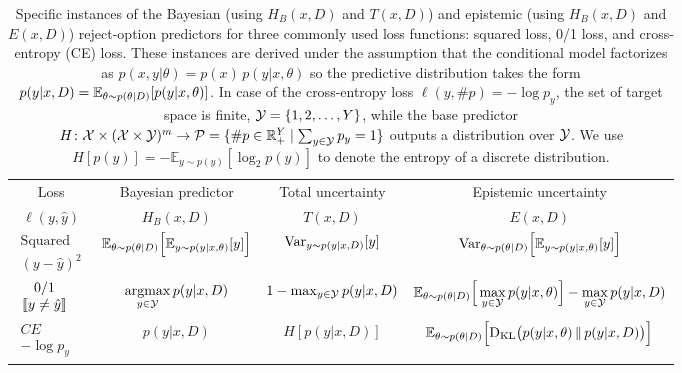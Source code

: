 \begin{table}[]
    \centering
    \begin{tabular}{l|c|c|c}
          \multicolumn{1}{c|}{Loss}& Bayesian predictor & Total uncertainty & Epistemic uncertainty\\
          \multicolumn{1}{c|}{$\ell(y,\hat{y})$} & $H_B(x,D)$        & $T(x,D)$          & $E(x,D)$ \\
       \hline%
       \hline
       $\begin{array}{c}\text{Squared} \\ (y-\hat{y})^2\end{array}$ &
       ${\mathbb{E}}_{\theta\sim p(\theta|D)}\Big[{\mathbb{E}}_{y\sim p(y|x,\theta)}[y] \Big ]$  &
       ${\rm Var}_{y\sim p(y|x,D)} [y]$&
       ${\rm Var}_{\theta\sim p(\theta|D)} \Big [ {\mathbb{E}}_{y\sim p(y|x,\theta)}[y] \Big ]$\\
       \hline
       $\begin{array}{c}\text{0/1} \\ \leftbb y\neq \hat{y}\rightbb\end{array}$ & 
       $\mathop{\rm argmax}\limits_{y\in{\cal Y}} p(y|x,D)$  &
       $1-\max_{y\in{\cal Y}} p(y|x,D)$ &
       ${\mathbb{E}}_{\theta\sim p(\theta|D)}\Big[ \max\limits_{y\in{\cal Y}} p(y|x,\theta)\Big ] - \max\limits_{y\in{\cal Y}} p(y|x,D)$ \\
       \hline
       $\begin{array}{c}CE\\  -\log p_y\end{array}$ & $p(y|x,D)$ & $H[p(y|x,D)]$ &
       ${\mathbb{E}}_{\theta\sim p(\theta|D)} \Big [{\rm D}_{\rm KL}\big (p(y|x,\theta)\, \|\, p(y|x,D)\big ) \Big ]$ \\       
    \end{tabular}
    \caption{Specific instances of the Bayesian (using $H_B(x,D)$ and $T(x,D)$) and epistemic (using $H_B(x,D)$ and $E(x,D)$) reject-option predictors for three commonly used loss functions: squared loss, 0/1 loss, and cross-entropy (CE) loss. These instances are derived under the assumption that the conditional model factorizes as $p(x,y|\theta)=p(x)\,p(y|x,\theta)$
    so the predictive distribution takes the form $p(y|x,D)={\mathbb{E}}_{\theta\sim p(\theta|D)}[p(y|x,\theta)]$.
    In case of the cross-entropy loss $\ell(y,\#p)=-\log p_y$, the set of target space is finite, ${\cal Y}=\{1,2,\ldots,Y\}$, while the base predictor $H\colon{\cal X}\times({\cal X}\times{\cal Y})^m\rightarrow{\cal P}=\{\#p\in\mathbb{R}_+^Y\mid \sum_{y\in{\cal Y}}p_y=1\}$ outputs a distribution over ${\cal Y}$. We use $H[p(y)] = -\mathbb{E}_{y \sim p(y)}[\log_2 p(y)]$ to denote the entropy of a discrete distribution.}
    \label{tab:Summary}
\end{table}

